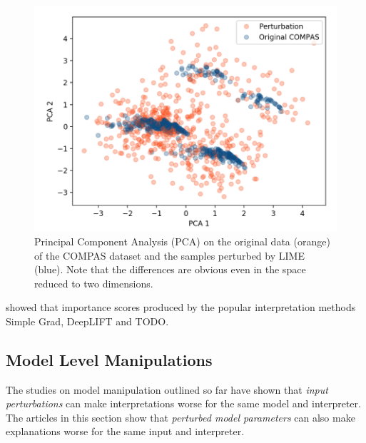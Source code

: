\begin{figure}[ht]
    \centering
    \includegraphics[width=\linewidth]{figures/slack_ood_data.png}
    \caption{Principal Component Analysis (PCA) on the original data (orange) of the COMPAS dataset and the samples perturbed by LIME (blue). Note that the differences are obvious even in the space reduced to two dimensions.}
    \label{fig:slack_ood_data}
    \vspace{-0.3cm}
\end{figure}

\cite{ghorbani2019interpretation} showed that importance scores produced by the popular interpretation methods Simple Grad, DeepLIFT and TODO. 

\subsection{Model Level Manipulations}
The studies on model manipulation outlined so far have shown that \textit{input perturbations} can make interpretations worse for the same model and interpreter. The articles in this section show that \textit{perturbed model parameters} can also make explanations worse for the same input and interpreter.

